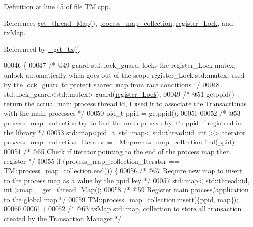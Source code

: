 Definition at line \hyperlink{_t_m_8cpp_source_l00045}{45} of file \hyperlink{_t_m_8cpp_source}{T\+M.\+cpp}.



References \hyperlink{_t_m_8cpp_source_l00148}{get\+\_\+thread\+\_\+\+Map()}, \hyperlink{_t_m_8h_source_l00095}{process\+\_\+map\+\_\+collection}, \hyperlink{_t_m_8h_source_l00107}{register\+\_\+\+Lock}, and \hyperlink{_t_m_8h_source_l00091}{tx\+Map}.



Referenced by \hyperlink{_t_m_8cpp_source_l00081}{\+\_\+get\+\_\+tx()}.


\begin{DoxyCode}
00046 \{
00047   \textcolor{comment}{/* @49 guard std::lock\_guard, locks the register\_Lock mutex, unlock automatically when goes out of the
       scope register\_Lock std::mutex, used by the lock\_guard to protect shared map from race conditions */}
00048     std::lock\_guard<std::mutex> guard(\hyperlink{class_t_m_aeb26546681bfe64e21606b8c012bb8c3_aeb26546681bfe64e21606b8c012bb8c3}{register\_Lock});
00049     \textcolor{comment}{/* @51 getppid() return the actual main process thread id, I used it to associate the Transactionas
       with the main processes */}
00050     pid\_t ppid = getppid();
00051 
00052     \textcolor{comment}{/* @53 process\_map\_collection try to find the main process by it's ppid if registred in the library */}
00053     std::map<pid\_t, std::map< std::thread::id, int >>::iterator process\_map\_collection\_Iterator = 
      \hyperlink{class_t_m_a6d417b18213968da2a70a914e80d639b_a6d417b18213968da2a70a914e80d639b}{TM::process\_map\_collection}.find(ppid);
00054     \textcolor{comment}{/* @55 Check if iterator pointing to the end of the process map then register */}
00055     \textcolor{keywordflow}{if} (process\_map\_collection\_Iterator == \hyperlink{class_t_m_a6d417b18213968da2a70a914e80d639b_a6d417b18213968da2a70a914e80d639b}{TM::process\_map\_collection}.end()) \{
00056         \textcolor{comment}{/* @57 Require new map to insert to the process map as a value by the ppid key  */}
00057         std::map< std::thread::id, int >map = \hyperlink{class_t_m_afb8bc9f42fe06c52747beb7f4c46915c_afb8bc9f42fe06c52747beb7f4c46915c}{get\_thread\_Map}();
00058         \textcolor{comment}{/* @59 Register main process/application to the global map  */}
00059         \hyperlink{class_t_m_a6d417b18213968da2a70a914e80d639b_a6d417b18213968da2a70a914e80d639b}{TM::process\_map\_collection}.insert(\{ppid, map\});
00060 
00061     \}
00062     \textcolor{comment}{/* @63 txMap std::map, collection to store all transaction created by the Transaction Manager */}

\end{DoxyCode}
